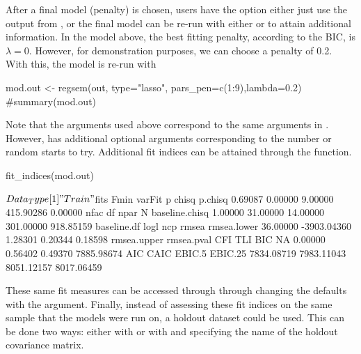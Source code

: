 \documentclass[article]{jss}
\begin{document}
After a final model (penalty) is chosen, users have the option either
just use the output from , or the final model can be
re-run with either  or  to attain
additional information. In the model above, the best fitting penalty,
according to the BIC, is \(\lambda=0\). However, for demonstration
purposes, we can choose a penalty of 0.2. With this, the model is re-run
with 

\begin{CodeChunk}
\begin{CodeInput}
mod.out <- regsem(out, type="lasso", pars_pen=c(1:9),lambda=0.2)
#summary(mod.out)
\end{CodeInput}
\end{CodeChunk}

Note that the arguments used above correspond to the same arguments in
. However,  has additional
optional arguments corresponding to the number or random starts to try.
Additional fit indices can be attained through the 
function.

\begin{CodeChunk}
\begin{CodeInput}
fit_indices(mod.out)
\end{CodeInput}
\begin{CodeOutput}
$Data_Type
[1] "Train"

$fits
          Fmin         varFit              p          chisq        p.chisq 
       0.69087        0.00000        9.00000      415.90286        0.00000 
          nfac             df           npar              N baseline.chisq 
       1.00000       31.00000       14.00000      301.00000      918.85159 
   baseline.df           logl            ncp          rmsea    rmsea.lower 
      36.00000    -3903.04360        1.28301        0.20344        0.18598 
   rmsea.upper     rmsea.pval            CFI            TLI            BIC 
            NA        0.00000        0.56402        0.49370     7885.98674 
           AIC           CAIC         EBIC.5        EBIC.25 
    7834.08719     7983.11043     8051.12157     8017.06459 
\end{CodeOutput}
\end{CodeChunk}

These same fit measures can be accessed through  through
changing the defaults with the  argument.
Finally, instead of assessing these fit indices on the same sample that
the models were run on, a holdout dataset could be used. This can be
done two ways: either with  or with
 and specifying the name of the
holdout covariance matrix.
\end{document}
